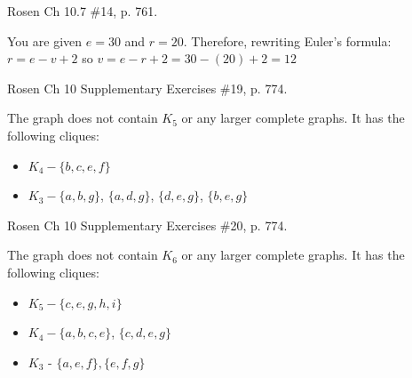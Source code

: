 \begin{questions}
\begin{solution}
\begin{enumerate}[label=(\alph*),itemsep=0pt,parsep=0pt,topsep=0pt,partopsep=0pt]
    \end{enumerate}

  \end{solution}



  \ifprintanswers
        \vspace{-10pt}
  \fi
{} Rosen Ch 10.7 \#14, p. 761.
  \ifprintanswers
        \vspace{-10pt}
  \fi
  \begin{solution}
    You are given $e = 30$ and $r = 20$. Therefore, rewriting Euler's formula: 
      $r = e - v + 2$ so $v = e - r + 2 = 30 - (20) + 2 = 12$
  \end{solution}



  \ifprintanswers
        \vspace{-10pt}
  \fi
{} Rosen Ch 10 Supplementary Exercises \#19, p. 774.
  \ifprintanswers
        \vspace{-10pt}
  \fi
  \begin{solution}
    The graph does not contain $K_5$ or any larger complete graphs.  It has the following cliques: 
    \begin{itemize}[itemsep=0pt,parsep=0pt,topsep=0pt,partopsep=0pt]
      \item $K_4 - \{b, c, e, f\}$ 
      \item $K_3 - \{a, b, g\}$, $\{a, d, g \}$, $\{d, e, g\}$, $\{b, e, g\}$
    \end{itemize}
  \end{solution}



  \ifprintanswers
        \vspace{-10pt}
  \fi
{} Rosen Ch 10 Supplementary Exercises \#20, p. 774.
  \ifprintanswers
        \vspace{-10pt}
  \fi
  \begin{solution}
  The graph does not contain $K_6$ or any larger complete graphs. It has the following cliques: 
  \begin{itemize}[itemsep=0pt,parsep=0pt,topsep=0pt,partopsep=0pt]
    \item $K_5 -  \{c, e, g, h, i\}$
    \item $K_4 -  \{a, b, c, e\}$, $\{c, d, e, g\}$
    \item $K_3$ - $\{a,e,f\}, \{e, f, g\}$
  \end{itemize}
  \end{solution}



\end{questions}
